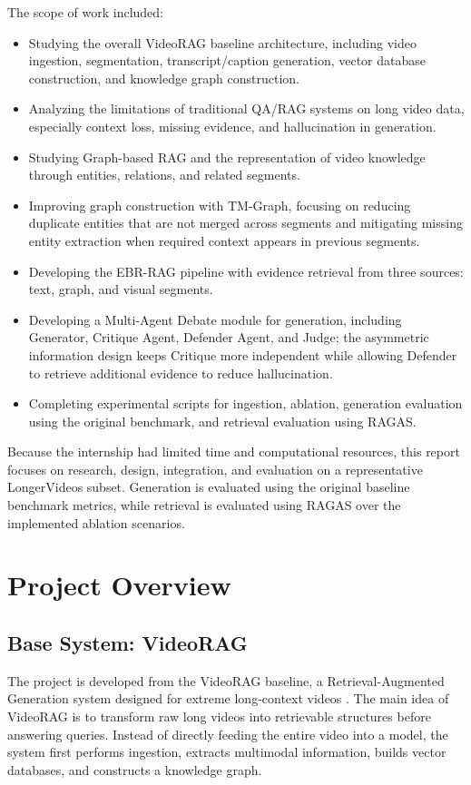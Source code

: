 \documentclass[12pt,a4paper]{article}
\begin{document}
The scope of work included:
\begin{itemize}
  \item Studying the overall VideoRAG baseline architecture, including video ingestion, segmentation, transcript/caption generation, vector database construction, and knowledge graph construction.
  \item Analyzing the limitations of traditional QA/RAG systems on long video data, especially context loss, missing evidence, and hallucination in generation.
  \item Studying Graph-based RAG and the representation of video knowledge through entities, relations, and related segments.
  \item Improving graph construction with TM-Graph, focusing on reducing duplicate entities that are not merged across segments and mitigating missing entity extraction when required context appears in previous segments.
  \item Developing the EBR-RAG pipeline with evidence retrieval from three sources: text, graph, and visual segments.
  \item Developing a Multi-Agent Debate module for generation, including Generator, Critique Agent, Defender Agent, and Judge; the asymmetric information design keeps Critique more independent while allowing Defender to retrieve additional evidence to reduce hallucination.
  \item Completing experimental scripts for ingestion, ablation, generation evaluation using the original benchmark, and retrieval evaluation using RAGAS.
\end{itemize}

Because the internship had limited time and computational resources, this report focuses on research, design, integration, and evaluation on a representative LongerVideos subset. Generation is evaluated using the original baseline benchmark metrics, while retrieval is evaluated using RAGAS over the implemented ablation scenarios.

\section{Project Overview}

\subsection{Base System: VideoRAG}

The project is developed from the VideoRAG baseline, a Retrieval-Augmented Generation system designed for extreme long-context videos \cite{ren2025videorag}. The main idea of VideoRAG is to transform raw long videos into retrievable structures before answering queries. Instead of directly feeding the entire video into a model, the system first performs ingestion, extracts multimodal information, builds vector databases, and constructs a knowledge graph.
\end{document}
